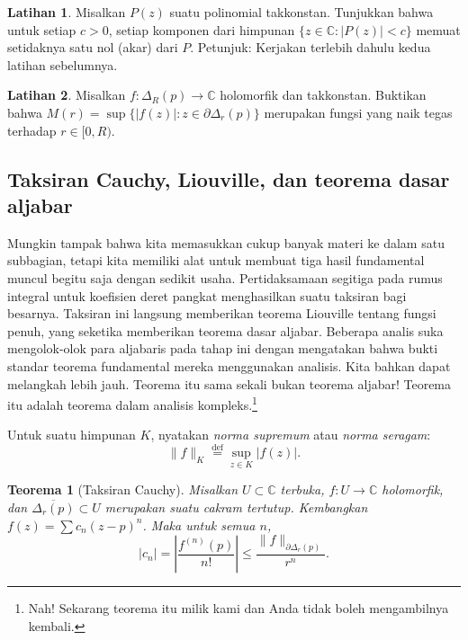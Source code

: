 \documentclass[12pt,openany]{book}
\newcommand{\sabs}[1]{\lvert {#1} \rvert}
\newcommand{\snorm}[1]{\lVert {#1} \rVert}
\newcommand{\abs}[1]{\left\lvert {#1} \right\rvert}
\newcommand{\C}{{\mathbb{C}}}
\newcommand{\myindex}[1]{#1\index{#1}}
\theoremstyle{plain}
\newtheorem{thm}{Teorema}[section]
\theoremstyle{remark}
\theoremstyle{definition}
\newenvironment{exbox}{%
    \def\FrameCommand{\vrule width 1pt \relax\hspace{10pt}}%
    \MakeFramed{\advance\hsize-\width\FrameRestore}%
}{%
    \endMakeFramed
}
\theoremstyle{exercise}
\newtheorem{exercise}{Latihan}[section]
\theoremstyle{example}
\begin{document}
\begin{exbox}
\begin{exercise}
Misalkan $P(z)$ suatu polinomial takkonstan.  Tunjukkan bahwa untuk setiap $c > 0$,
setiap komponen dari himpunan $\bigl\{ z \in \C : \sabs{P(z)} < c \bigr\}$
memuat setidaknya satu nol (akar) dari $P$.  Petunjuk: Kerjakan terlebih dahulu kedua
latihan sebelumnya.
\end{exercise}

\begin{exercise}
Misalkan $f \colon \Delta_R(p) \to \C$ holomorfik dan takkonstan.
Buktikan bahwa $M(r) = \sup \bigl\{ \sabs{f(z)} : z \in \partial \Delta_r(p)
\bigr\}$ merupakan fungsi yang naik tegas terhadap $r \in [0,R)$.
\end{exercise}
\end{exbox}


\subsection{Taksiran Cauchy, Liouville, dan teorema dasar
aljabar}

Mungkin tampak bahwa kita memasukkan cukup banyak materi ke dalam satu subbagian, tetapi
kita memiliki alat untuk membuat tiga hasil fundamental muncul begitu saja
dengan sedikit usaha.  Pertidaksamaan segitiga pada
rumus integral untuk koefisien deret pangkat menghasilkan suatu
taksiran bagi besarnya.  Taksiran ini langsung memberikan
teorema Liouville tentang fungsi penuh, yang seketika memberikan
teorema dasar aljabar.
Beberapa analis suka mengolok-olok para aljabaris pada tahap ini dengan mengatakan bahwa
bukti standar teorema fundamental mereka menggunakan analisis.
Kita bahkan dapat melangkah lebih jauh.
Teorema itu sama sekali bukan teorema aljabar!
Teorema itu adalah teorema dalam
analisis kompleks.\footnote{Nah! Sekarang teorema itu milik kami dan Anda tidak boleh mengambilnya kembali.}

Untuk suatu himpunan $K$, nyatakan \emph{\myindex{norma supremum}} atau
\emph{\myindex{norma seragam}}:
%
\begin{equation*}
\snorm{f}_K
\overset{\text{def}}{=}
\sup_{z \in K} \sabs{f(z)} .
\end{equation*}

\begin{thm}[Taksiran Cauchy]
Misalkan $U \subset \C$ terbuka, $f \colon U \to \C$
holomorfik, dan $\overline{\Delta_r(p)} \subset U$
merupakan suatu cakram tertutup.  Kembangkan $f(z) = \sum c_n {(z-p)}^n$.
Maka untuk semua $n$,
\begin{equation*}
\sabs{c_n} =
\abs{\frac{f^{(n)}(p)}{n!}}
\leq
\frac{\snorm{f}_{\partial \Delta_r(p)}}{r^{n}} .
\end{equation*}
\end{thm}
\end{document}
